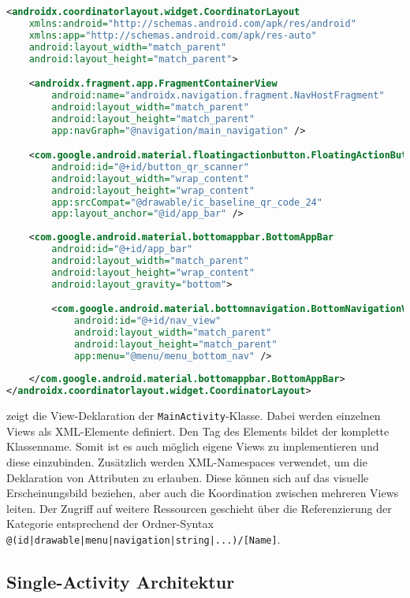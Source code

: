 \begin{lstlisting}[language=XML, caption={Layout-Definition der \texttt{MainActivity}-Klasse.}, label={lst:layout}]
<androidx.coordinatorlayout.widget.CoordinatorLayout  
    xmlns:android="http://schemas.android.com/apk/res/android"
    xmlns:app="http://schemas.android.com/apk/res-auto"
    android:layout_width="match_parent"
    android:layout_height="match_parent">

    <androidx.fragment.app.FragmentContainerView
        android:name="androidx.navigation.fragment.NavHostFragment"
        android:layout_width="match_parent"
        android:layout_height="match_parent"
        app:navGraph="@navigation/main_navigation" />

    <com.google.android.material.floatingactionbutton.FloatingActionButton
        android:id="@+id/button_qr_scanner"
        android:layout_width="wrap_content"
        android:layout_height="wrap_content"
        app:srcCompat="@drawable/ic_baseline_qr_code_24"
        app:layout_anchor="@id/app_bar" />
  
    <com.google.android.material.bottomappbar.BottomAppBar
        android:id="@+id/app_bar"
        android:layout_width="match_parent"
        android:layout_height="wrap_content"
        android:layout_gravity="bottom">

        <com.google.android.material.bottomnavigation.BottomNavigationView
            android:id="@+id/nav_view"
            android:layout_width="match_parent"
            android:layout_height="match_parent"
            app:menu="@menu/menu_bottom_nav" />
    
    </com.google.android.material.bottomappbar.BottomAppBar>
</androidx.coordinatorlayout.widget.CoordinatorLayout>  
\end{lstlisting}

 zeigt die View-Deklaration der \texttt{MainActivity}-Klasse. Dabei werden einzelnen Views als XML-Elemente definiert. Den Tag des Elements bildet der komplette Klassenname. Somit ist es auch möglich eigene Views zu implementieren und diese einzubinden. Zusätzlich werden XML-Namespaces verwendet, um die Deklaration von Attributen zu erlauben. Diese können sich auf das visuelle Erscheinungsbild beziehen, aber auch die Koordination zwischen mehreren Views leiten. Der Zugriff auf weitere Ressourcen geschieht über die Referenzierung der Kategorie entsprechend der Ordner-Syntax \texttt{@(id|drawable|menu|navigation|string|...)/[Name]}. 

\subsection{Single-Activity Architektur}\label{subsec:single-activity-architecture}

